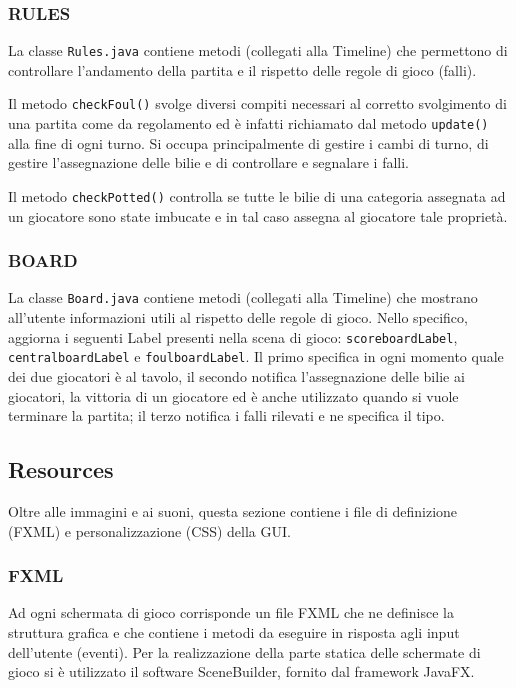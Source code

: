 \documentclass[12pt,a4paper]{report}
\begin{document}
\subsubsection*{RULES}
La classe \texttt{Rules.java} contiene metodi (collegati alla Timeline) che permettono di controllare l'andamento della partita e il rispetto delle regole di gioco (falli).

\vspace{3mm}

Il metodo \texttt{checkFoul()} svolge diversi compiti necessari al corretto svolgimento di una partita come da regolamento ed è infatti richiamato dal metodo \texttt{update()} alla fine di ogni turno.
Si occupa principalmente di gestire i cambi di turno, di gestire l'assegnazione delle bilie e di controllare e segnalare i falli.

\vspace{3mm}

Il metodo \texttt{checkPotted()} controlla se tutte le bilie di una categoria assegnata ad un giocatore sono state imbucate e in tal caso assegna al giocatore tale proprietà.

\subsubsection*{BOARD}
La classe \texttt{Board.java} contiene metodi (collegati alla Timeline) che mostrano all'utente informazioni utili al rispetto delle regole di gioco.
Nello specifico, aggiorna i seguenti Label presenti nella scena di gioco: \texttt{scoreboardLabel}, \texttt{centralboardLabel} e \texttt{foulboardLabel}.
Il primo specifica in ogni momento quale dei due giocatori è al tavolo, il secondo notifica l'assegnazione delle bilie ai giocatori, la vittoria di un giocatore ed è anche utilizzato quando si vuole terminare la partita; il terzo notifica i falli rilevati e ne specifica il tipo.

\subsection{Resources}\label{se:Resources} %

Oltre alle immagini e ai suoni, questa sezione contiene i file di definizione (FXML) e personalizzazione (CSS) della GUI.

\subsubsection*{FXML}
Ad ogni schermata di gioco corrisponde un file FXML che ne definisce la struttura grafica e che contiene i metodi da eseguire in risposta agli input dell'utente (eventi).
Per la realizzazione della parte statica delle schermate di gioco si è utilizzato il software SceneBuilder, fornito dal framework JavaFX. \cite{JavaFX}
\end{document}
